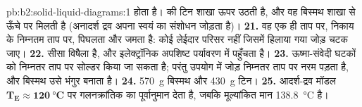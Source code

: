 \begin{solution}{pb:b2:solid-liquid-diagrams:1}
होता है।  की टिन शाखा ऊपर उठती है, और वह
बिस्मथ शाखा से ऊँचे पर मिलती है (अनादर्श द्रव अपना स्वयं का संशोधन जोड़ता है)।
\textbf{21.} वह एक ही ताप पर, निकाय के निम्नतम ताप पर, पिघलता और जमता है:
कोई लेईदार परिसर नहीं जिसमें हिलाया गया जोड़ चटक जाए।
\textbf{22.} सीसा विषैला है, और इलेक्ट्रॉनिक अपशिष्ट पर्यावरण में पहुँचता है।
\textbf{23.} ऊष्मा-संवेदी घटकों को निम्नतर ताप पर सोल्डर किया जा सकता है;
परंतु उपयोग में जोड़ निम्नतर ताप पर नरम पड़ता है, और बिस्मथ उसे
भंगुर बनाता है।
\textbf{24.} \qty{570}{g} बिस्मथ और \qty{430}{g} टिन।
\textbf{25.} आदर्श-द्रव मॉडल $\boldsymbol{T_E
\approx \qty{120}{\degreeCelsius}}$ पर गलनक्रांतिक का पूर्वानुमान देता है, जबकि
मूल्यांकित मान \qty{138.8}{\degreeCelsius} है।
\end{solution}

